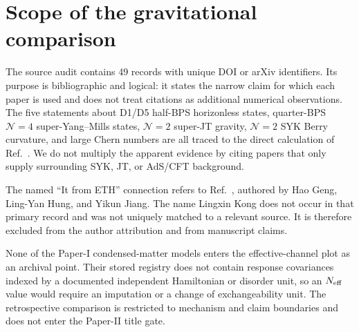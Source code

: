 \section{Scope of the gravitational comparison}
\label{app:literature-scope}

The source audit contains 49 records with unique DOI or arXiv identifiers.  Its purpose is bibliographic and logical: it states the narrow claim for which each paper is used and does not treat citations as additional numerical observations.  The five statements about D1/D5 half-BPS horizonless states, quarter-BPS $\mathcal N=4$ super-Yang--Mills states, $\mathcal N=2$ super-JT gravity, $\mathcal N=2$ SYK Berry curvature, and large Chern numbers are all traced to the direct calculation of Ref.~\cite{chen2026berry}.  We do not multiply the apparent evidence by citing papers that only supply surrounding SYK, JT, or AdS/CFT background.

The named ``It from ETH'' connection refers to Ref.~\cite{itfrometh2025}, authored by Hao Geng, Ling-Yan Hung, and Yikun Jiang.  The name Lingxin Kong does not occur in that primary record and was not uniquely matched to a relevant source.  It is therefore excluded from the author attribution and from manuscript claims.

None of the Paper-I condensed-matter models enters the effective-channel plot as an archival point.  Their stored registry does not contain response covariances indexed by a documented independent Hamiltonian or disorder unit, so an $N_{\rm eff}$ value would require an imputation or a change of exchangeability unit.  The retrospective comparison is restricted to mechanism and claim boundaries and does not enter the Paper-II title gate.
